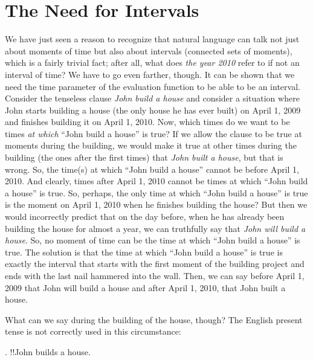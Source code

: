 \section{The Need for Intervals}

We have just seen a reason to recognize that natural language can talk not just about moments of time but also about intervals (connected sets of moments), which is a fairly trivial fact; after all, what does \emph{the year 2010} refer to if not an interval of time? We have to go even farther, though. It can be shown that we need the time parameter of the evaluation function to be able to be an interval. Consider the tenseless clause \emph{John build a house} and consider a situation where John starts building a house (the only house he has ever built) on April 1, 2009 and finishes building it on April 1, 2010. Now, which times do we want to be times \emph{at which} ``John build a house'' is true? If we allow the clause to be true at moments during the building, we would make it true at other times during the building (the ones after the first times) that \emph{John built a house}, but that is wrong. So, the time(s) at which ``John build a house'' cannot be before April 1, 2010. And clearly, times after April 1, 2010 cannot be times at which ``John build a house'' is true. So, perhaps, the only time at which ``John build a house'' is true is the moment on April 1, 2010 when he finishes building the house? But then we would incorrectly predict that on the day before, when he has already been building the house for almost a year, we can truthfully say that \emph{John will build a house}. So, no moment of time can be the time at which ``John build a house'' is true. The solution is that the time at which ``John build a house'' is true is exactly the interval that starts with the first moment of the building project and ends with the last nail hammered into the wall. Then, we can say before April 1, 2009 that John will build a house and after April 1, 2010, that John built a house.

What can we say during the building of the house, though? The English present tense is not correctly used in this circumstance:

\ex. !!John builds a house.

